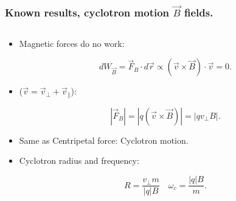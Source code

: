 \documentclass{beamer}
\begin{document}
\begin{frame}
\frametitle{Known results, cyclotron motion $\vec{B}$ fields.}
\begin{columns}
\begin{column}{0.5\linewidth}
\begin{itemize}
\item<2-> Magnetic forces do no work:

\begin{equation*}
dW_{\vec{B}}= \vec{F}_B \cdot d\vec{r}\propto (\vec{v}\times \vec{B})\cdot \vec{v} = 0.
\end{equation*}

\item<3-> ($\vec{v}=\vec{v}_\perp+\vec{v}_\parallel$):

\begin{equation*}
|\vec{F}_B| = |q ( \vec{v}\times \vec{B})| =|q v_{\perp} B|.
\end{equation*}
\item<4-> Same as Centripetal force: Cyclotron motion.

\item<5-> Cyclotron radius and frequency:

\begin{equation*}
R = \frac{v_\perp m}{|q|B} \quad \omega_c =\frac{|q|B}{m}.
\end{equation*}


\end{itemize}
\end{column}
\end{columns}
\end{frame}
\end{document}

